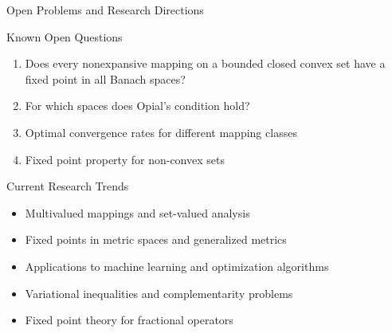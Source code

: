 \documentclass[aspectratio=169,10pt]{beamer}
\begin{document}
\begin{frame}[allowframebreaks]{Open Problems and Research Directions}
    \begin{block}{Known Open Questions}
        \begin{enumerate}
            \item Does every nonexpansive mapping on a bounded closed convex set have a fixed point in all Banach spaces?
            \item For which spaces does Opial's condition hold?
            \item Optimal convergence rates for different mapping classes
            \item Fixed point property for non-convex sets
        \end{enumerate}
    \end{block}

    \begin{block}{Current Research Trends}
        \begin{itemize}
            \item Multivalued mappings and set-valued analysis
            \item Fixed points in metric spaces and generalized metrics
            \item Applications to machine learning and optimization algorithms
            \item Variational inequalities and complementarity problems
            \item Fixed point theory for fractional operators
        \end{itemize}
    \end{block}
\end{frame}
\end{document}
